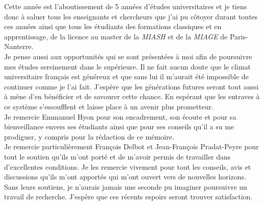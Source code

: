 \documentclass[
12pt, %
french, %
singlespacing, %
headsepline, %
]{MastersDoctoralThesis} %
\begin{document}
\ohead*{} %
\ofoot*{\pagemark} %
\begin{acknowledgements}

Cette année est l'aboutissement de 5 années d'études universitaires et je tiens donc à saluer tous les enseignants et chercheurs que j'ai pu côtoyer durant toutes ces années ainsi que tous les étudiants des formations classiques et en apprentissage, de la licence au master de la \textit{MIASH} et de la \textit{MIAGE} de Paris-Nanterre.\\

Je pense aussi aux opportunités qui se sont présentées à moi afin de poursuivre mes études sereinement dans le supérieure. Il ne fait aucun doute que le climat universitaire français est généreux et que sans lui il m'aurait été impossible de continuer comme je l'ai fait. J'espère que les générations futures seront tout aussi à mène d'en bénéficier et de savourer cette chance. En espérant que les entraves à ce système s'essoufflent et laisse place à un avenir plus prometteur.\\

Je remercie Emmanuel Hyon pour son encadrement, son écoute et pour sa bienveillance envers ses étudiants ainsi que pour ses conseils qu'il a su me prodiguer, y compris pour la rédaction de ce mémoire.\\

Je remercie particulièrement François Delbot et Jean-François Pradat-Peyre pour tout le soutien qu'ils m'ont porté et de m'avoir permis de travailler dans d'excellentes conditions. Je les remercie vivement pour tout les conseils, avis et discussions qu'ils m'ont apportés qui m'ont ouvert vers de nouvelles horizons.
Sans leurs soutiens, je n'aurais jamais une seconde pu imaginer poursuivre un travail de recherche. J'espère que ces récents espoirs seront trouver satisfaction.

\end{acknowledgements}



\tableofcontents %
\end{document}
